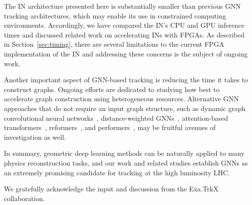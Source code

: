 \documentclass[twocolumn]{svjour3}
\begin{document}
The IN architecture presented here is substantially smaller than previous GNN tracking architectures, which may enable its use in constrained computing environments.
Accordingly, we have compared the IN's CPU and GPU inference times and discussed related work on accelerating INs with FPGAs. 
As described in Section~\ref{sec:timing}, there are several limitations to the current FPGA implementation of the IN and addressing these concerns is the subject of ongoing work. 
  


Another important aspect of GNN-based tracking is reducing the time it takes to construct graphs. 
Ongoing efforts are dedicated to studying how best to accelerate graph construction using heterogeneous resources.
Alternative GNN approaches that do not require an input graph structure, such as dynamic graph convolutional neural networks~\cite{DGCNN}, distance-weighted GNNs~\cite{Qasim:2019otl}, attention-based transformers~\cite{vaswani2017attention}, reformers~\cite{kitaev2020reformer}, and performers~\cite{choromanski2021rethinking}, may be fruitful avenues of investigation as well.

In summary, geometric deep learning methods can be naturally applied to many physics reconstruction tasks, and our work and related studies establish GNNs as an extremely promising candidate for tracking at the high luminosity LHC. 





\begin{acknowledgements}
We gratefully acknowledge the input and discussion from the Exa.TrkX collaboration.
\end{acknowledgements}



\end{document}
